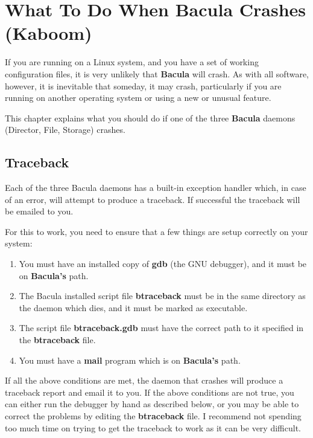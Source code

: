
\section*{What To Do When Bacula Crashes (Kaboom)}
\label{_ChapterStart47}

If you are running on a Linux system, and you have a set of working
configuration files, it is very unlikely that {\bf Bacula} will crash. As with
all software, however, it is inevitable that someday, it may crash,
particularly if you are running on another operating system or using a new or
unusual feature. 

This chapter explains what you should do if one of the three {\bf Bacula}
daemons (Director, File, Storage) crashes. 

\subsection*{Traceback}

Each of the three Bacula daemons has a built-in exception handler which, in
case of an error, will attempt to produce a traceback. If successful the
traceback will be emailed to you. 

For this to work, you need to ensure that a few things are setup correctly on
your system: 

\begin{enumerate}
\item You must have an installed copy of {\bf gdb} (the GNU debugger),  and it
   must be on {\bf Bacula's} path. 
\item The Bacula installed script file {\bf btraceback} must  be in the same
   directory as the daemon which dies, and it must  be marked as executable.  
\item The script file {\bf btraceback.gdb} must  have the correct  path to it
   specified in the {\bf btraceback} file.  
\item You must have a {\bf mail} program which is on {\bf Bacula's}  path. 
   \end{enumerate}

If all the above conditions are met, the daemon that crashes will produce a
traceback report and email it to you. If the above conditions are not true,
you can either run the debugger by hand as described below, or you may be able
to correct the problems by editing the {\bf btraceback} file. I recommend not
spending too much time on trying to get the traceback to work as it can be
very difficult. 

